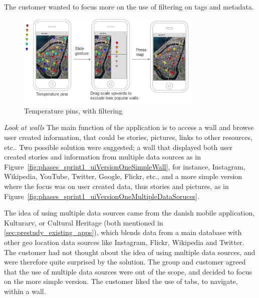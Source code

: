 \documentclass[11pt]{book}
\begin{document}
The customer wanted to focus more on the use of filtering on tags and metadata.

\begin{figure}[H]
    \centering
    \includegraphics[width=0.8\textwidth]{Figures/Phases/Sprint1/versiononeTempPings.png}
    \caption{Temperature pins, with filtering}
    \label{fig:phases_sprint1_uiVersionOneTempPings}
\end{figure}

\textit{Look at walls}
The main function of the application is to access a wall and browse user created information, that could be stories, pictures, links to other resources, etc.. Two possible solution were suggested; a wall that displayed both user created stories and information from multiple data sources as in Figure~\ref{fig:phases_sprint1_uiVersionOneSimpleWall}, for instance, Instagram, Wikipedia, YouTube, Twitter, Google, Flickr, etc., and a more simple version where the focus was on user created data, thus stories and pictures, as in Figure~\ref{fig:phases_sprint1_uiVersionOneMultipleDataSoruces}.

The idea of using multiple data sources came from the danish mobile application, Kulturarv, or Cultural Heritage (both mentioned in \ref{sec:prestudy_existing_apps}), which blends data from a main database with other geo location data sources like Instagram, Flickr, Wikipedia and Twitter. The customer had not thought about the idea of using multiple data sources, and were therefore quite surprised by the solution. The group and customer agreed that the use of multiple data sources were out of the scope, and decided to focus on the more simple version. The customer liked the use of tabs, to navigate, within a wall.
\end{document}
